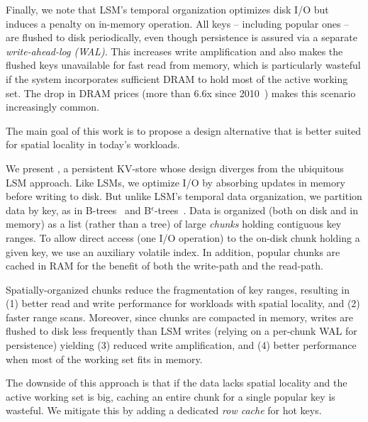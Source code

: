 Finally, we note that LSM's temporal  organization optimizes disk I/O but induces a penalty on in-memory operation. 
All keys -- including popular ones -- are flushed to disk periodically, even though persistence is assured 
via a separate \emph{write-ahead-log (WAL)}.
This increases write amplification and also makes the flushed keys unavailable for fast read from memory,
which is particularly wasteful if the system incorporates sufficient DRAM to hold most of the active working set. 
The drop in DRAM prices (more than $6.6$x since 2010~\cite{dram-prices})  
makes this scenario increasingly common.  

The main goal of this work is to propose a design alternative  that is better suited for spatial locality in 
today's workloads. 

We present \sys, a persistent KV-store whose design diverges from the ubiquitous LSM approach.  
Like  LSMs,  we optimize I/O by absorbing updates in memory before writing to disk. 
But unlike LSM's temporal data organization, we partition data by key, as in B-trees~\cite{Comer79} and B$^\epsilon$-trees~\cite{Bender15}. 
Data is  organized (both on disk and in memory) as a list (rather than a tree) 
of large \emph{chunks} holding contiguous key ranges.
To allow direct access (one I/O operation) to the on-disk chunk holding a given key, we use an auxiliary volatile index.  
In addition, popular chunks are cached in RAM for the benefit of  both the write-path and the read-path.

Spatially-organized chunks reduce the fragmentation of key ranges, resulting in 
(1) better read and write performance for workloads with spatial locality,  and
(2) faster range scans. 
Moreover, since chunks  are compacted in memory, writes are 
flushed to disk less frequently than LSM writes (relying on a per-chunk WAL for persistence)
yielding 
(3) reduced write amplification, and 
(4) better performance when most of the working set fits in memory.

The downside of this approach is that if the data lacks spatial locality and the active working set is big, 
caching an entire chunk for a single popular key is wasteful. We mitigate this  by adding 
a dedicated \emph{row cache} for hot keys. 

